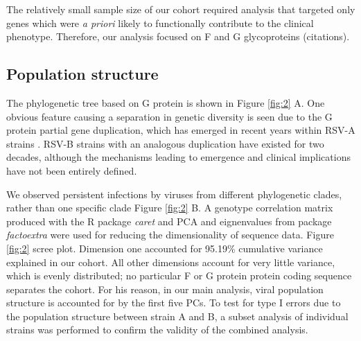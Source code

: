\documentclass{article}
\begin{document}
The relatively small sample size of our cohort required analysis that targeted only genes which were \textit{a priori} likely to functionally contribute to the clinical phenotype. 
Therefore, our analysis focused on F and G glycoproteins (citations).

\subsection{Population structure}
The phylogenetic tree based on G protein is shown in 
Figure \ref{fig:2} A.
One obvious feature causing a separation in genetic diversity is seen due to the G protein partial gene duplication, 
which has emerged in recent years within RSV-A strains 
\cite{eshaghi2012genetic}.
RSV-B strains with an analogous duplication have existed for two decades, 
although the mechanisms leading to emergence and clinical implications have not been entirely defined.

We observed persistent infections by viruses from different phylogenetic clades, rather than one specific clade 
Figure \ref{fig:2} B.
A genotype correlation matrix produced with the R package \textit{caret} and PCA and eignenvalues from package \textit{factoextra} were used for reducing the dimensionality of sequence data.
Figure \ref{fig:2} scree plot.
Dimension one accounted for 95.19\% cumulative variance explained in our cohort.
All other dimensions account for very little variance, which is evenly distributed; no particular F or G protein protein coding sequence separates the cohort.
For his reason, in our main analysis, viral population structure is accounted for by the first five PCs. 
To test for type I errors due to the population structure between strain A and B, 
a subset analysis of individual strains was performed to confirm the validity of the combined analysis.
\end{document}
